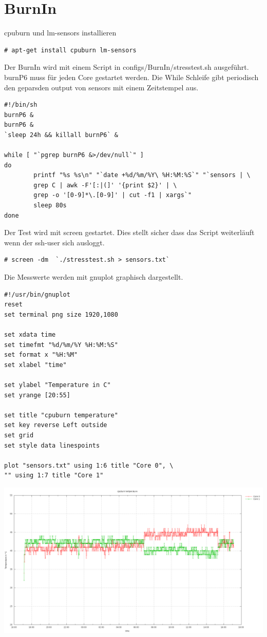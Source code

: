 \section{BurnIn}
cpuburn und lm-sensors installieren 
\begin{lstlisting}[style=Bash]
# apt-get install cpuburn lm-sensors
\end{lstlisting}
Der BurnIn wird mit einem Script in configs/BurnIn/stresstest.sh ausgeführt.\\
burnP6 muss für jeden Core gestartet werden. Die While Schleife gibt periodisch den geparsden output von sensors mit einem Zeitstempel aus.
\begin{lstlisting}[style=Bash]
#!/bin/sh
burnP6 &
burnP6 &
`sleep 24h && killall burnP6` &

while [ "`pgrep burnP6 &>/dev/null`" ]
do
        printf "%s %s\n" "`date +%d/%m/%Y\ %H:%M:%S`" "`sensors | \
		grep C | awk -F'[:|(]' '{print $2}' | \
		grep -o '[0-9]*\.[0-9]' | cut -f1 | xargs`"
        sleep 80s
done
\end{lstlisting}
Der Test wird mit screen gestartet. Dies stellt sicher dass das Script weiterläuft wenn der ssh-user sich ausloggt.
\begin{lstlisting}[style=Bash]
# screen -dm  `./stresstest.sh > sensors.txt`
\end{lstlisting}
Die Messwerte werden mit gnuplot graphisch dargestellt.
\begin{lstlisting}[style=Bash]
#!/usr/bin/gnuplot
reset
set terminal png size 1920,1080

set xdata time
set timefmt "%d/%m/%Y %H:%M:%S"
set format x "%H:%M"
set xlabel "time"

set ylabel "Temperature in C"
set yrange [20:55]

set title "cpuburn temperature"
set key reverse Left outside
set grid
set style data linespoints

plot "sensors.txt" using 1:6 title "Core 0", \
"" using 1:7 title "Core 1"
\end{lstlisting}
\includegraphics[width=\textwidth,height=\textheight,keepaspectratio]{../aufgabe1/BurnIn/png_single_core.png}
